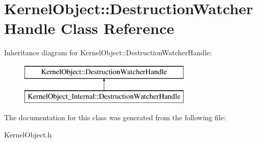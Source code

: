 \hypertarget{class_kernel_object_1_1_destruction_watcher_handle}{}\section{Kernel\+Object\+:\+:Destruction\+Watcher\+Handle Class Reference}
\label{class_kernel_object_1_1_destruction_watcher_handle}
Inheritance diagram for Kernel\+Object\+:\+:Destruction\+Watcher\+Handle\+:\begin{figure}[H]
\begin{center}
\leavevmode
\includegraphics[height=2.000000cm]{class_kernel_object_1_1_destruction_watcher_handle}
\end{center}
\end{figure}


The documentation for this class was generated from the following file\+:\begin{DoxyCompactItemize}
\item 
Kernel\+Object.\+h\end{DoxyCompactItemize}
